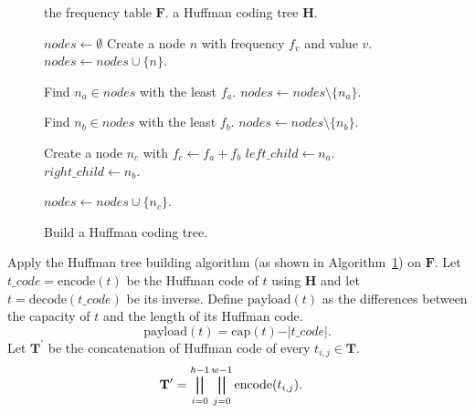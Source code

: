\documentclass[journal]{IEEEtran}
\begin{document}
	\begin{figure}[!t]
		\begin{algorithm}[H]
			\caption{Build a Huffman coding tree.}
			\label{algo:buildtree}
			
			\begin{algorithmic}[1]
				\Require the frequency table \(\mathbf{F}\).
				\Ensure a Huffman coding tree \(\mathbf{H}\).
				
				\State \(nodes \gets \emptyset\)
				\State Create a node \(n\) with frequency \(f_v\) and value \(v\).
				\State \(nodes \gets nodes \cup \{n\}\).
				\EndFor
				
				\State Find \(n_a \in nodes\) with the least \(f_a\).
				\State \(nodes \gets nodes \setminus \{n_a\}\).
				
				\State Find \(n_b \in nodes\) with the least \(f_b\).
				\State \(nodes \gets nodes \setminus \{n_b\}\).
				
				\State Create a node \(n_c\) with 
				\State\hspace{\algorithmicindent} \(f_c \leftarrow f_a + f_b\)
				\State\hspace{\algorithmicindent} \(left\_child \leftarrow n_a\).
				\State\hspace{\algorithmicindent} \(right\_child \leftarrow n_b\).
				
				\State \(nodes \gets nodes \cup \{n_c\}\).
				\EndWhile
			\end{algorithmic}
		\end{algorithm}
	\end{figure}
	
	Apply the Huffman tree building algorithm (as shown in Algorithm~\ref{algo:buildtree}) on \(\mathbf{F}\).
	Let \(t\_code = \mathrm{encode}(t)\) be the Huffman code of \(t\) using \(\mathbf{H}\) and let \(t = \mathrm{decode}(t\_code)\) be its inverse. 
	Define \(\mathrm{payload}(t)\) as the differences between the capacity of $t$ and the length of its Huffman code. 
%	
	\begin{equation}
		\label{eq:payload}
		\mathrm{payload}(t) = \mathrm{cap}(t) - \vert t\_code \vert .
	\end{equation}
%
	Let \(\mathbf{T^\prime}\) be the concatenation of Huffman code of every \(t_{i, j} \in \mathbf{T}\).
%	
	\begin{align}
		\label{eq:encodeT1}
		\mathbf{T^\prime} &= \bigparallel_{i = 0}^{h - 1}  { \bigparallel_{j = 0}^{w - 1} \mathrm{encode}(t_{i, j})}. %
	\end{align}
\end{document}
